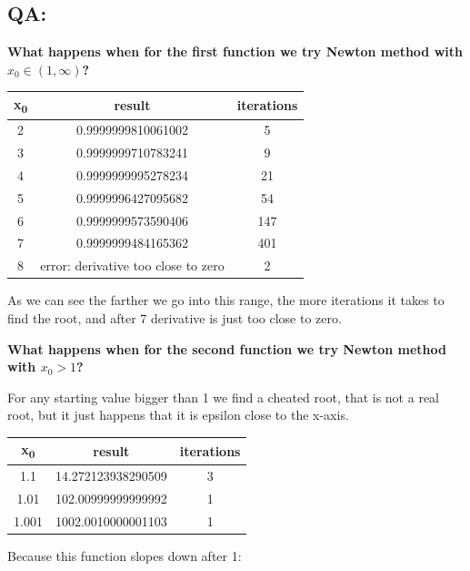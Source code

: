 \documentclass{article}
\begin{document}
\subsection*{QA:}
\begin{center}
    \textbf{What happens when for the first function we try Newton method with \textit{\(x_0 \in (1, \infty)\)}?}
\end{center}
\begin{center}
    \begin{tabular}{| c | c | c |}
        \hline
         x\textsubscript{0} & result & iterations \\ 
        \hline
        \hline
        2 & 0.9999999810061002 & 5 \\
        \hline
        3 & 0.9999999710783241 & 9 \\
        \hline
        4 & 0.9999999995278234 & 21 \\
        \hline
        5 & 0.9999996427095682 & 54 \\
        \hline
        6 & 0.9999999573590406 & 147 \\
        \hline
        7 & 0.9999999484165362 & 401 \\
        \hline
        8 & error: derivative too close to zero & 2 \\
        \hline
    \end{tabular}
\end{center}
As we can see the farther we go into this range, the more iterations it takes to find the root, and after 7 derivative is just too close to zero.
\begin{center}
    \textbf{What happens when for the second function we try Newton method with \textit{\(x_0 > 1\)}?}
\end{center}
For any starting value bigger than 1 we find a cheated root, that is not a real root, but it just happens that it is epsilon close to the x-axis.
\begin{center}
    \begin{tabular}{| c | c | c |}
        \hline
         x\textsubscript{0} & result & iterations \\ 
        \hline
        \hline
        1.1 & 14.272123938290509 & 3 \\
        \hline
        1.01 & 102.00999999999992 & 1 \\
        \hline
        1.001 & 1002.0010000001103 & 1 \\
        \hline
    \end{tabular}
\end{center}
Because this function slopes down after 1:
\end{document}
